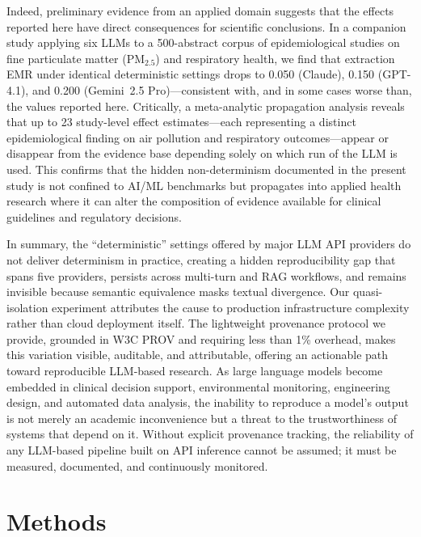 \documentclass[sn-nature]{sn-jnl}
\begin{document}
Indeed, preliminary evidence from an applied domain suggests that the effects reported here have direct consequences for scientific conclusions.
In a companion study applying six LLMs to a 500-abstract corpus of epidemiological studies on fine particulate matter (PM$_{2.5}$) and respiratory health\cite{rover2026evidence}, we find that extraction EMR under identical deterministic settings drops to 0.050 (Claude), 0.150 (GPT-4.1), and 0.200 (Gemini~2.5 Pro)---consistent with, and in some cases worse than, the values reported here.
Critically, a meta-analytic propagation analysis reveals that up to 23 study-level effect estimates---each representing a distinct epidemiological finding on air pollution and respiratory outcomes---appear or disappear from the evidence base depending solely on which run of the LLM is used.
This confirms that the hidden non-determinism documented in the present study is not confined to AI/ML benchmarks but propagates into applied health research where it can alter the composition of evidence available for clinical guidelines and regulatory decisions.

In summary, the ``deterministic'' settings offered by major LLM API providers do not deliver determinism in practice, creating a hidden reproducibility gap that spans five providers, persists across multi-turn and RAG workflows, and remains invisible because semantic equivalence masks textual divergence.
Our quasi-isolation experiment attributes the cause to production infrastructure complexity rather than cloud deployment itself.
The lightweight provenance protocol we provide, grounded in W3C PROV and requiring less than 1\% overhead, makes this variation visible, auditable, and attributable, offering an actionable path toward reproducible LLM-based research.
As large language models become embedded in clinical decision support, environmental monitoring, engineering design, and automated data analysis, the inability to reproduce a model's output is not merely an academic inconvenience but a threat to the trustworthiness of systems that depend on it.
Without explicit provenance tracking, the reliability of any LLM-based pipeline built on API inference cannot be assumed; it must be measured, documented, and continuously monitored.


\section{Methods}\label{sec:methods}
\end{document}
